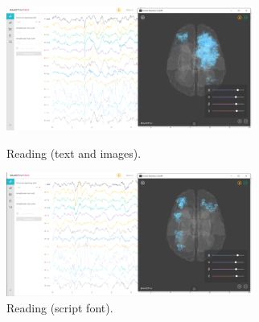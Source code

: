 \documentclass[english]{textolivre}
\begin{document}
\begin{figure}[htbp]
 \centering
 \begin{minipage}{.45\textwidth}
 \includegraphics[width=\textwidth]{Fig4.png}
 \caption{Reading (text and images).}
 \label{fig04}
 \end{minipage}%
 \qquad
 \begin{minipage}{0.45\textwidth}
 \includegraphics[width=\textwidth]{Fig5.png}
 \caption{Reading (script font).}
 \label{fig05}
 \end{minipage}%
\end{figure}
\end{document}
